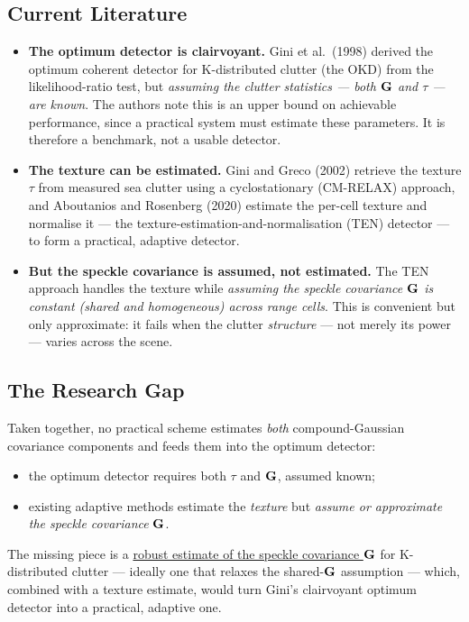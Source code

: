 \documentclass{article}
\begin{document}
\subsection{Current Literature}
\begin{itemize}
  \item \textbf{The optimum detector is clairvoyant.} Gini et al.\ (1998) derived the
  optimum coherent detector for K-distributed clutter (the OKD) from the
  likelihood-ratio test, but \emph{assuming the clutter statistics --- both $\mathbf{G}$ and
  $\tau$ --- are known}. The authors note this is an upper bound on achievable
  performance, since a practical system must estimate these parameters. It is therefore
  a benchmark, not a usable detector.
  \item \textbf{The texture can be estimated.} Gini and Greco (2002) retrieve the
  texture $\tau$ from measured sea clutter using a cyclostationary (CM-RELAX) approach,
  and Aboutanios and Rosenberg (2020) estimate the per-cell texture and normalise it
  --- the texture-estimation-and-normalisation (TEN) detector --- to form a practical,
  adaptive detector.
  \item \textbf{But the speckle covariance is assumed, not estimated.} The TEN approach
  handles the texture while \emph{assuming the speckle covariance $\mathbf{G}$ is constant
  (shared and homogeneous) across range cells}. This is convenient but only
  approximate: it fails when the clutter \emph{structure} --- not merely its power ---
  varies across the scene.
\end{itemize}

\subsection{The Research Gap}
Taken together, no practical scheme estimates \emph{both} compound-Gaussian covariance
components and feeds them into the optimum detector:
\begin{itemize}
  \item the optimum detector requires both $\tau$ and $\mathbf{G}$, assumed known;
  \item existing adaptive methods estimate the \emph{texture} but \emph{assume or
  approximate the speckle covariance} $\mathbf{G}$.
\end{itemize}
The missing piece is a \underline{robust estimate of the speckle covariance $\mathbf{G}$}
for K-distributed clutter --- ideally one that relaxes the shared-$\mathbf{G}$ assumption
--- which, combined with a texture estimate, would turn Gini's clairvoyant optimum
detector into a practical, adaptive one.
\end{document}
